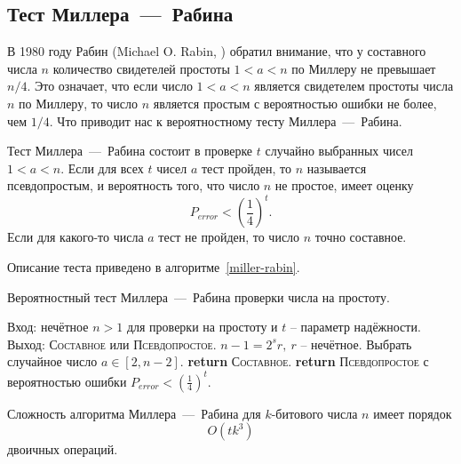 \subsection{Тест Миллера~---~Рабина}\label{section-prime-check-miller-rabin}

В 1980 году Рабин (Michael O. Rabin, \cite{Rabin:1980}) обратил внимание, что у составного числа $n$ количество свидетелей простоты $1 < a < n$ по Миллеру не превышает $n/4$. Это означает, что если число $1 < a < n$ является свидетелем простоты числа $n$ по Миллеру, то число $n$ является простым с вероятностью ошибки не более, чем $1/4$. Что приводит нас к вероятностному тесту Миллера~---~Рабина.

Тест Миллера~---~Рабина состоит в проверке $t$ случайно выбранных чисел $1 < a < n$. Если для всех $t$ чисел $a$ тест пройден, то $n$ называется псевдопростым, и вероятность того, что число $n$ не простое, имеет оценку
    \[ P_{error} < \left( \frac{1}{4} \right)^t. \]
Если для какого-то числа $a$ тест не пройден, то число $n$ точно составное.

Описание теста приведено в алгоритме~\ref{miller-rabin}.

\begin{algorithm}[iht]
    \caption{Вероятностный тест Миллера~---~Рабина проверки числа на простоту.\label{miller-rabin}}
    \begin{algorithmic}
        \STATE Вход: нечётное $n>1$ для проверки на простоту и $t$ -- параметр надёжности.
        \STATE Выход: \textsc{Составное} или \textsc{Псевдопростое}.
        \STATE $n - 1 = 2^s r, ~ r$ -- нечётное.
            \STATE Выбрать случайное число $a \in [2, n-2]$.
               \STATE \textbf{return} \textsc{Составное}.
           \ENDIF
        \ENDFOR
       \STATE \textbf{return} \textsc{Псевдопростое} с вероятностью ошибки $P_{error} < \left( \frac{1}{4} \right)^t$.
    \end{algorithmic}
\end{algorithm}

Сложность алгоритма Миллера~---~Рабина для $k$-битового числа $n$ имеет порядок
    \[ O(t k^3) \]
двоичных операций.

